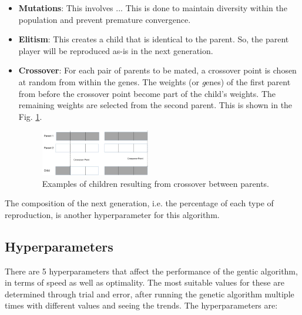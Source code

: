 \documentclass{article}
\begin{document}
\begin{enumerate}
{    \begin{itemize}
        \item{
            {\bf Mutations}: This involves ... This is done to maintain diversity within the population and prevent premature convergence.
        }
        \item{
            {\bf Elitism}: This creates a child that is identical to the parent. So, the parent player will be reproduced as-is in the next generation.
        }
        \item{
            {\bf Crossover}: For each pair of parents to be mated, a crossover point is chosen at random from within the genes. The weights (or {\textit genes}) of the first parent from before the crossover point become part of the child's weights. The remaining weights are selected from the second parent. This is shown in the Fig. \ref{fig:crossover}. 
    
             \begin{figure}[!t]
            	\centering
            	\includegraphics[width=0.45\textwidth]{crossover.png}
            	\caption{Examples of children resulting from crossover between parents.}
            	\label{fig:crossover}
            \end{figure}
        }
    \end{itemize}

	The composition of the next generation, i.e. the percentage of each type of reproduction, is another hyperparameter for this algorithm.
}
\end{enumerate}

\subsection{Hyperparameters}

There are 5 hyperparameters that affect the performance of the gentic algorithm, in terms of speed as well as optimality. The most suitable values for these are determined through trial and error, after running the genetic algorithm multiple times with different values and seeing the trends. The hyperparameters are:
\end{document}

